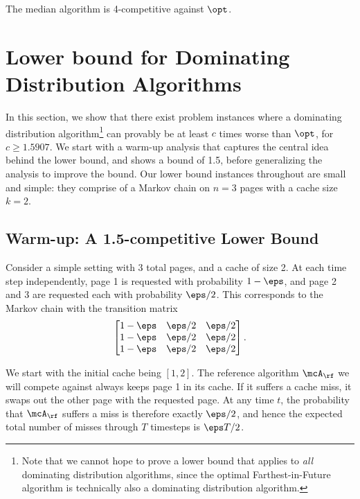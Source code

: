 \documentclass[11pt]{article}
\begin{document}
\begin{corollary}
    \label{corollary:median-is-4-competitive}
    The median algorithm is 4-competitive against $\opt$.
\end{corollary}
 \section{Lower bound for Dominating Distribution Algorithms}
\label{sec:lb}

In this section, we show that there exist problem instances where a dominating distribution algorithm\footnote{Note that we cannot hope to prove a lower bound that applies to \textit{all} dominating distribution algorithms, since the optimal Farthest-in-Future algorithm is technically also a dominating distribution algorithm.} can provably be at least $c$ times worse than $\opt$, for $c \ge 1.5907$. We start with a warm-up analysis that captures the central idea behind the lower bound, and shows a bound of 1.5, before generalizing the analysis to improve the bound. Our lower bound instances throughout are small and simple: they comprise of a Markov chain on $n=3$ pages with a cache size $k=2$.

\subsection{Warm-up: A 1.5-competitive Lower Bound}
\label{sec:1.5-lb}

Consider a simple setting with 3 total pages, and a cache of size 2. At each time step independently, page 1 is requested with probability $1-\eps$, and page 2 and 3 are requested each with probability $\eps/2$. This corresponds to the Markov chain with the transition matrix
\begin{align*}
    \begin{bmatrix}
        1-\eps & \eps/2 & \eps/2 \\
        1-\eps & \eps/2 & \eps/2 \\
        1-\eps & \eps/2 & \eps/2
    \end{bmatrix}.
\end{align*}

We start with the initial cache being $[1,2]$. The reference algorithm $\mcA_{\rf}$ we will compete against always keeps page 1 in its cache. If it suffers a cache miss, it swaps out the other page with the requested page. At any time $t$, the probability that $\mcA_{\rf}$ suffers a miss is therefore exactly $\eps/2$, and hence the expected total number of misses through $T$ timesteps is $\eps T/2$.
\end{document}
